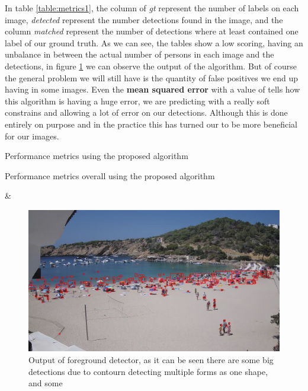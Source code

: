 \documentclass[10pt]{article}
\begin{document}
In table \ref{table:metrics1}, the column of \textit{gt} represent the number of labels on each image, \textit{detected} represent the number detections found in the image, and the column \textit{matched} represent the number of detections where at least contained one label of our ground truth. As we can see, the tables show a low scoring, having an unbalance in between the actual number of persons in each image and the detections, in figure \ref*{fig:detections} we can observe the output of the algorithm. But of course the general problem we will still have is the quantity of false positives we end up having in some images. Even the \textbf{mean squared error} with a value of  tells how this algorithm is having a huge error, we are predicting with a really soft constrains and allowing a lot of error on our detections. Although this is done entirely on purpose and in the practice this has turned our to be more beneficial for our images.\newline


\begin{table} [h]
  \centering
  \caption[Performance metrics Basic]{Performance metrics using the proposed algorithm}\label{table:metrics1}
\end{table}

\begin{table} [h]
  \centering
  \caption[Performance metrics overall]{Performance metrics overall using the proposed algorithm}\label{table:metrics_2}

  {\csvcoli & \csvcolii}%
\end{table}

\begin{figure}[h]
  \centering
  \includegraphics[width=\textwidth]{img/det_name.jpg}
  \caption{Output of foreground detector, as it can be seen there are some big detections due to contourn detecting multiple forms as one shape, and some }
  \label{fig:detections}
\end{figure}
\end{document}
